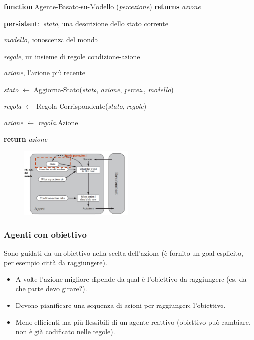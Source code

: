 \textbf{function} Agente-Basato-su-Modello (\textit{percezione}) \textbf{returns} \textit{azione}

\textbf{persistent}:\ \textit{stato}, una descrizione dello stato corrente

\qquad \qquad \qquad \textit{modello}, conoscenza del mondo

\qquad \qquad \qquad \textit{regole}, un insieme di regole condizione-azione

\qquad \qquad \qquad \textit{azione}, l'azione più recente

\textit{stato} $\leftarrow$ Aggiorna-Stato(\textit{stato}, \textit{azione}, \textit{percez}., \textit{modello})

\textit{regola} $\leftarrow$ Regola-Corrispondente(\textit{stato}, \textit{regole})

\textit{azione} $\leftarrow$ \textit{regola}.Azione

\textbf{return} \textit{azione}

\begin{figure}[H]
	\centering
	\includegraphics[width=0.5\textwidth]{immagini/Agenti_modelBased.jpg}
\end{figure}

\subsubsection{Agenti con obiettivo}

Sono guidati da un obiettivo nella scelta dell'azione (è fornito un goal esplicito, per esempio città da raggiungere).\

\begin{itemize}
	\item A volte l'azione migliore dipende da qual è l'obiettivo da raggiungere (es. da che parte devo girare?).
	\item Devono pianificare una sequenza di azioni per raggiungere l'obiettivo.
	\item Meno efficienti ma più flessibili di un agente reattivo (obiettivo può cambiare, non è già codificato nelle regole).
\end{itemize}

